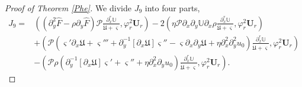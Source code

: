 \documentclass{amsart}
\numberwithin{equation}{section}
\begin{document}
\begin{proof}[Proof of Theorem \ref{Phe}]
We divide $J_{9}$ into four parts,
\begin{align}\label{J9}
J_{9}
=&\left((\partial_{y}^{2}\hat{F}-\rho\partial_{y}\hat{F})\mathcal{P}\frac{\partial_{x}^{r}\mathbb{U}}{\dot{\mathfrak{U}}+\varsigma},\varphi_{r}^{2}\mathbf{U}_{r}\right)
  -2\left(\eta\mathcal{P}\partial_{x}\partial_{y}\mathbb{U}\partial_{x}\rho\frac{\partial_{x}^{r}\mathbb{U}}{\dot{\mathfrak{U}}+\varsigma},\varphi_{r}^{2}\mathbf{U}_{r}\right)\\
 &+\left(\mathcal{P}\left(\varsigma'\partial_{x}\mathfrak{U}+\varsigma'''+\partial_{y}^{-1}[\partial_{x}\mathfrak{U}]\varsigma''-\varsigma\partial_{x}\partial_{y}\mathfrak{U}+\eta\partial_{x}^{2}\partial_{y}^{2}u_{0}\right)\frac{\partial_{x}^{r}\mathbb{U}}{\dot{\mathfrak{U}}+\varsigma},\varphi_{r}^{2}\mathbf{U}_{r}\right)\nonumber\\
 &-\left(\mathcal{P}\rho\left(\partial_{y}^{-1}[\partial_{x}\mathfrak{U}]\varsigma'+\varsigma''+\eta\partial_{x}^{2}\partial_{y}u_{0}\right)\frac{\partial_{x}^{r}\mathbb{U}}{\dot{\mathfrak{U}}+\varsigma},\varphi_{r}^{2}\mathbf{U}_{r}\right).\nonumber
\end{align}


\end{proof}
\end{document}

